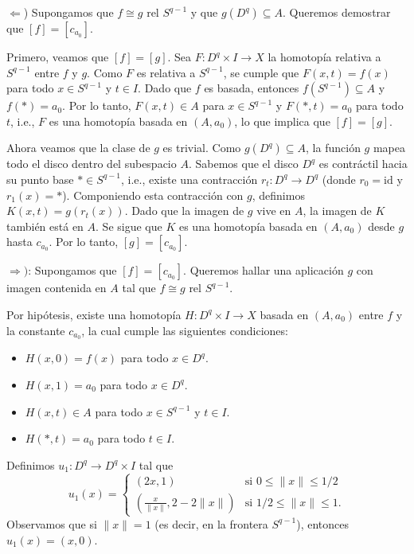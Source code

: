 \begin{dem}
    $\Leftarrow$) Supongamos que $f \cong g \text{ rel } S^{q-1}$ y que $g(D^q) \subseteq A$. Queremos demostrar que $[f] = [c_{a_0}] $.
    
    Primero, veamos que $[f] = [g]$. Sea $F: D^q \times I \to X$ la homotopía relativa a $S^{q-1}$ entre $f$ y $g$. 
    Como $F$ es relativa a $S^{q-1}$, se cumple que $F(x, t) = f(x)$ para todo $x \in S^{q-1}$ y $t \in I$. 
    Dado que $f$ es basada, entonces $f(S^{q-1}) \subseteq A$ y $f(*) = a_0$. Por lo tanto, $F(x,t) \in A$ para $x \in S^{q-1}$ y $F(*,t) = a_0$ para todo $t$, i.e., $F$ es una homotopía basada en $(A,a_0)$, lo que implica que $[f] = [g]$.
    
    Ahora veamos que la clase de $g$ es trivial. Como $g(D^q) \subseteq A$, la función $g$ mapea todo el disco dentro del subespacio $A$.
    Sabemos que el disco $D^q$ es contráctil hacia su punto base $* \in S^{q-1}$, i.e., existe una contracción $r_t: D^q \to D^q$ (donde $r_0 = \text{id}$ y $r_1(x) = *$).
    Componiendo esta contracción con $g$, definimos $K(x,t) = g(r_t(x))$.
    Dado que la imagen de $g$ vive en $A$, la imagen de $K$ también está en $A$. 
    Se sigue que $K$ es una homotopía basada en $(A,a_0)$ desde $g$ hasta $c_{a_0}$. Por lo tanto, $[g] = [c_{a_0}]$.
   
    $\Rightarrow)$: Supongamos que $[f] = [c_{a_0}]$. Queremos hallar una aplicación $g$ con imagen contenida en $A$ tal que $f \cong g \text{ rel } S^{q-1}$.
    
    Por hipótesis, existe una homotopía $H: D^q \times I \to X$ basada en $(A,a_0)$ entre $f$ y la constante $c_{a_0}$, la cual cumple las siguientes condiciones:
    \begin{itemize}
        \item[(1)] $H(x,0) = f(x)$ para todo $x \in D^q$.
        \item[(2)] $H(x,1) = a_0$ para todo $x \in D^q$.
        \item[(3)] $H(x,t) \in A$ para todo $x \in S^{q-1}$ y $t \in I$.
        \item[(4)] $H(*,t) = a_0$ para todo $t \in I$.
    \end{itemize}
    Definimos $u_1: D^q \to D^q \times I$ tal que
    \begin{equation*}
        u_1(x) = 
        \begin{cases} 
            (2x, 1) & \text{si } 0 \le \|x\| \le 1/2 \\ 
            \left(\frac{x}{\|x\|}, 2 - 2\|x\|\right) & \text{si } 1/2 \le \|x\| \le 1.
        \end{cases}
    \end{equation*}
    Observamos que si $\|x\| = 1$ (es decir, en la frontera $S^{q-1}$), entonces $u_1(x) = (x, 0)$. 
    

\end{dem}
